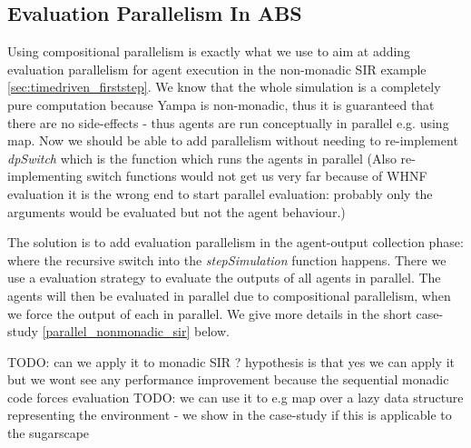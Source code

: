 \subsection{Evaluation Parallelism In ABS}
Using compositional parallelism is exactly what we use to aim at adding evaluation parallelism for agent execution in the non-monadic SIR example \ref{sec:timedriven_firststep}. We know that the whole simulation is a completely pure computation because Yampa is non-monadic, thus it is guaranteed that there are no side-effects - thus agents are run conceptually in parallel e.g. using map. Now we should be able to add parallelism without needing to re-implement \textit{dpSwitch} which is the function which runs the agents in parallel (Also re-implementing switch functions would not get us very far because of WHNF evaluation it is the wrong end to start parallel evaluation: probably only the arguments would be evaluated but not the agent behaviour.)

The solution is to add evaluation parallelism in the agent-output collection phase: where the recursive switch into the \textit{stepSimulation} function happens. There we use a evaluation strategy to evaluate the outputs of all agents in parallel. The agents will then be evaluated in parallel due to compositional parallelism, when we force the output of each in parallel. We give more details in the short case-study \ref{parallel_nonmonadic_sir} below.

TODO: can we apply it to monadic SIR ? hypothesis is that yes we can apply it but we wont see any performance improvement because the sequential monadic code forces evaluation
TODO: we can use it to e.g map over a lazy data structure representing the environment - we show in the case-study if this is applicable to the sugarscape
